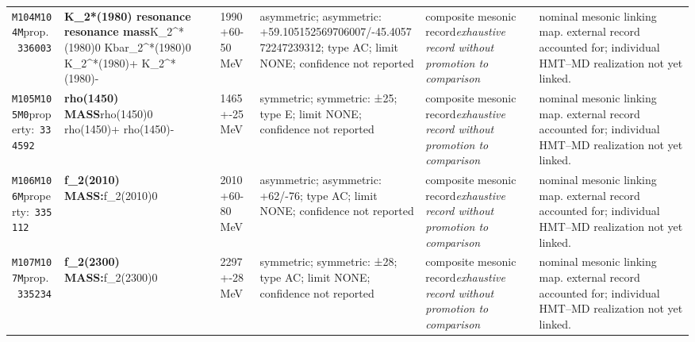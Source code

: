 \begin{landscape}
\begin{longtable}{L{1.85cm}L{4.45cm}L{2.35cm}L{4.05cm}L{3.35cm}L{7.15cm}}
\texttt{M104}\newline \texttt{M104M}\newline prop.\ \texttt{336003} & \textbf{K\_\allowbreak{}2*(1980) resonance resonance mass}\newline K\_\allowbreak{}2\textasciicircum{}*(1980)0 \textbar{}\allowbreak{} Kbar\_\allowbreak{}2\textasciicircum{}*(1980)0 \textbar{}\allowbreak{} K\_\allowbreak{}2\textasciicircum{}*(1980)+ \textbar{}\allowbreak{} K\_\allowbreak{}2\textasciicircum{}*(1980)- & 1990+60-50\,MeV & asymmetric; asymmetric: +59.105152569706007/-45.405772247239312; type AC; limit NONE; confidence not reported & composite mesonic record\newline \emph{exhaustive record without promotion to comparison} & nominal mesonic linking map. external record accounted for; individual HMT--MD realization not yet linked. \\
\texttt{M105}\newline \texttt{M105M0}\newline property:\ \texttt{334592} & \textbf{rho(1450) MASS}\newline rho(1450)0 \textbar{}\allowbreak{} rho(1450)+ \textbar{}\allowbreak{} rho(1450)- & 1465+-25\,MeV & symmetric; symmetric: ±25; type E; limit NONE; confidence not reported & composite mesonic record\newline \emph{exhaustive record without promotion to comparison} & nominal mesonic linking map. external record accounted for; individual HMT--MD realization not yet linked. \\
\texttt{M106}\newline \texttt{M106M}\newline property:\ \texttt{335112} & \textbf{f\_\allowbreak{}2(2010) MASS:}\newline f\_\allowbreak{}2(2010)0 & 2010+60-80\,MeV & asymmetric; asymmetric: +62/-76; type AC; limit NONE; confidence not reported & composite mesonic record\newline \emph{exhaustive record without promotion to comparison} & nominal mesonic linking map. external record accounted for; individual HMT--MD realization not yet linked. \\
\texttt{M107}\newline \texttt{M107M}\newline prop.\ \texttt{335234} & \textbf{f\_\allowbreak{}2(2300) MASS:}\newline f\_\allowbreak{}2(2300)0 & 2297+-28\,MeV & symmetric; symmetric: ±28; type AC; limit NONE; confidence not reported & composite mesonic record\newline \emph{exhaustive record without promotion to comparison} & nominal mesonic linking map. external record accounted for; individual HMT--MD realization not yet linked. \\

\end{longtable}
\end{landscape}
